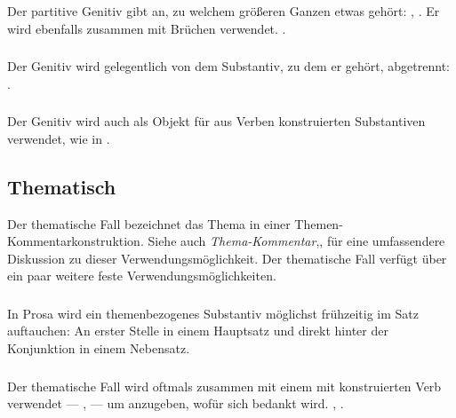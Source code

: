 \subsubsection{} Der partitive Genitiv gibt an, zu welchem gr\"o\ss{}eren Ganzen etwas
geh\"ort: , . Er wird ebenfalls
zusammen mit Br\"uchen verwendet.
 . 
\label{syn:partitive-gen}

\subsubsection{} Der Genitiv wird gelegentlich von dem Substantiv, zu dem er geh\"ort,
abgetrennt:  
.

\subsubsection{} Der Genitiv wird auch als Objekt f\"ur aus Verben konstruierten
Substantiven verwendet, wie in  .

\subsection{Thematisch} Der thematische Fall bezeichnet das Thema in einer
Themen-Kommentarkonstruktion. Siehe auch \textit{Thema-Kommentar},,
f\"ur eine umfassendere Diskussion zu dieser Verwendungsm\"oglichkeit.
Der thematische Fall verf\"ugt \"uber ein paar weitere feste Verwendungsm\"oglichkeiten.

\subsubsection{} In Prosa wird ein themenbezogenes Substantiv m\"oglichst fr\"uhzeitig im
Satz auftauchen: An erster Stelle in einem Hauptsatz und direkt hinter der Konjunktion in
einem Nebensatz.\label{syn:topical:word-order}

\subsubsection{} Der thematische Fall wird oftmals zusammen mit einem mit  konstruierten
Verb verwendet --- ,  --- um anzugeben, wof\"ur sich bedankt wird.
, .

